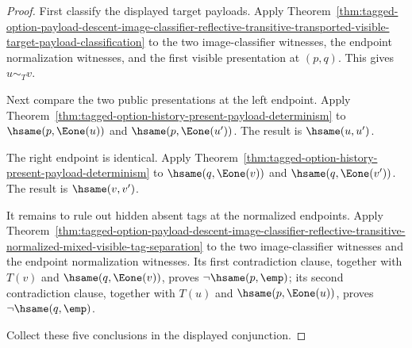 \begin{proof}
First classify the displayed target payloads. Apply
Theorem~\ref{thm:tagged-option-payload-descent-image-classifier-reflective-transitive-transported-visible-target-payload-classification}
to the two image-classifier witnesses, the endpoint normalization witnesses,
and the first visible presentation at $(p,q)$. This gives $u\sim_T v$.

Next compare the two public presentations at the left endpoint. Apply
Theorem~\ref{thm:tagged-option-history-present-payload-determinism} to
$\hsame(p,\Eone(u))$ and $\hsame(p,\Eone(u'))$. The result is
$\hsame(u,u')$.

The right endpoint is identical. Apply
Theorem~\ref{thm:tagged-option-history-present-payload-determinism} to
$\hsame(q,\Eone(v))$ and $\hsame(q,\Eone(v'))$. The result is
$\hsame(v,v')$.

It remains to rule out hidden absent tags at the normalized endpoints. Apply
Theorem~\ref{thm:tagged-option-payload-descent-image-classifier-reflective-transitive-normalized-mixed-visible-tag-separation}
to the two image-classifier witnesses and the endpoint normalization witnesses.
Its first contradiction clause, together with $T(v)$ and
$\hsame(q,\Eone(v))$, proves $\neg\hsame(p,\emp)$; its second contradiction
clause, together with $T(u)$ and $\hsame(p,\Eone(u))$, proves
$\neg\hsame(q,\emp)$.

Collect these five conclusions in the displayed conjunction.
\end{proof}

